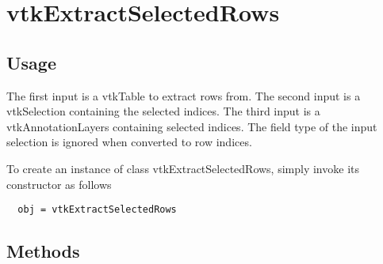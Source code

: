 \section{vtkExtractSelectedRows}

\subsection{Usage}

 The first input is a vtkTable to extract rows from.
 The second input is a vtkSelection containing the selected indices.
 The third input is a vtkAnnotationLayers containing selected indices.
 The field type of the input selection is ignored when converted to row
 indices.

To create an instance of class vtkExtractSelectedRows, simply
invoke its constructor as follows
\begin{verbatim}
  obj = vtkExtractSelectedRows
\end{verbatim}
\subsection{Methods}

